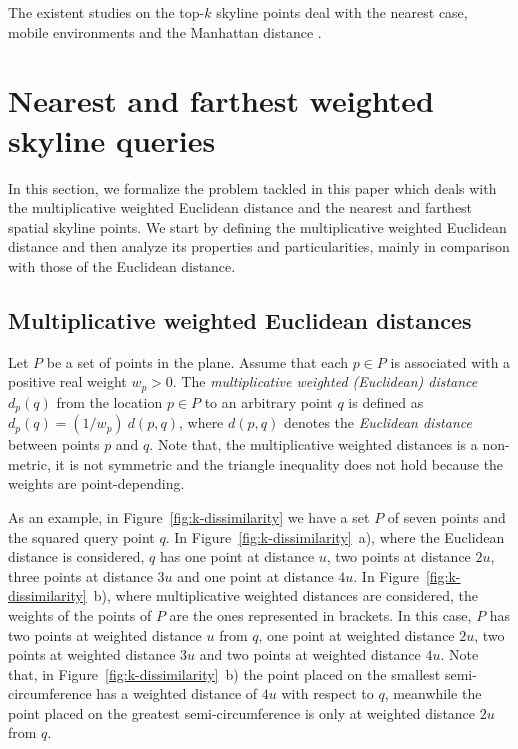 \documentclass[11pt,onecolumn]{elsart3p}
\begin{document}
The existent studies on the top-$k$ skyline points deal with the nearest case, mobile environments \cite{PS14} and the Manhattan distance \cite{SSKA17}.

\section{Nearest and farthest weighted skyline queries}\label{sec:Theoretical_study}

In this section, we formalize the problem tackled in this paper which deals with the multiplicative weighted Euclidean distance and the nearest and farthest spatial skyline points. We start by defining the multiplicative weighted Euclidean distance and then analyze its properties and particularities, mainly in comparison with those of the Euclidean distance.

\subsection{Multiplicative weighted Euclidean distances}

Let $P$ be a set of points in the plane. Assume that each $p \in P$ is associated with a positive real weight $w_p > 0$. The {\it multiplicative weighted (Euclidean) distance} $d_p(q)$ from the location $p \in P$ to an arbitrary point $q$ is defined as $d_p(q)=(1/w_p)~d(p,q)$, where $d(p,q)$ denotes the {\it Euclidean distance} between points $p$ and $q$. Note that, the multiplicative weighted distances is a non-metric, it is not symmetric and the triangle inequality does not hold because the weights are point-depending.

\vspace{1em}
As an example, in Figure~\ref{fig:k-dissimilarity} we have a set $P$ of seven points and the squared query point $q$. In Figure~\ref{fig:k-dissimilarity}~a), where the Euclidean distance is considered, $q$ has one point at distance $u$, two points at distance $2u$, three points at distance $3u$ and one point at distance $4u$. In Figure~\ref{fig:k-dissimilarity}~b), where multiplicative weighted distances are considered, the weights of the points of $P$ are the ones represented in brackets. In this case, $P$ has two points at weighted distance $u$ from $q$, one point at weighted distance $2u$, two points at weighted distance $3u$ and two points at weighted distance $4u$. Note that, in Figure~\ref{fig:k-dissimilarity}~b) the point placed on the smallest semi-circumference has a weighted distance of $4u$ with respect to $q$, meanwhile the point placed on the greatest semi-circumference is only at weighted distance $2u$ from $q$.
\end{document}
